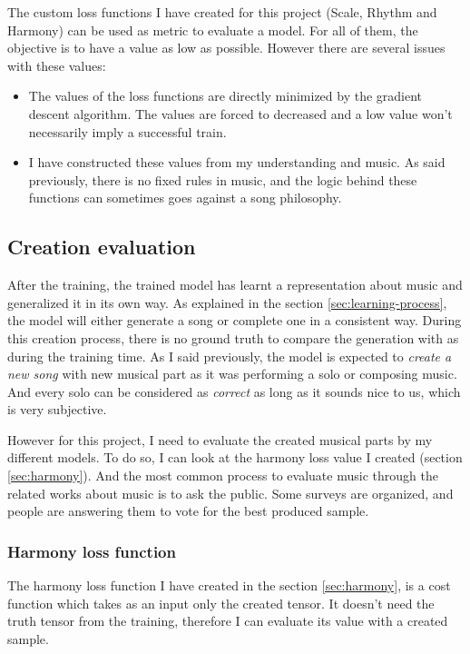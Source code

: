 \documentclass[12pt]{report}
\begin{document}
The custom loss functions I have created for this project (Scale, Rhythm and Harmony) can be used as metric to evaluate a model.
For all of them, the objective is to have a value as low as possible.
However there are several issues with these values:
\begin{itemize}
    \item The values of the loss functions are directly minimized by the gradient descent algorithm.
    The values are forced to decreased and a low value won't necessarily imply a successful train.
    \item I have constructed these values from my understanding and music.
    As said previously, there is no fixed rules in music, and the logic behind these functions can sometimes goes against a song philosophy.
\end{itemize}

\subsection{Creation evaluation}

After the training, the trained model has learnt a representation about music and generalized it in its own way.
As explained in the section \ref{sec:learning-process}, the model will either generate a song or complete one in a consistent way.
During this creation process, there is no ground truth to compare the generation with as during the training time.
As I said previously, the model is expected to \textit{create a new song} with new musical part as it was performing a solo or composing music.
And every solo can be considered as \textit{correct} as long as it sounds nice to us, which is very subjective.

However for this project, I need to evaluate the created musical parts by my different models.
To do so, I can look at the harmony loss value I created (section \ref{sec:harmony}).
And the most common process to evaluate music through the related works about music is to ask the public.
Some surveys are organized, and people are answering them to vote for the best produced sample.

\subsubsection{Harmony loss function}
\label{sec:eval:creation:harmony}

The harmony loss function I have created in the section \ref{sec:harmony}, is a cost function which takes as an input only the created tensor.
It doesn't need the truth tensor from the training, therefore I can evaluate its value with a created sample.
\end{document}
